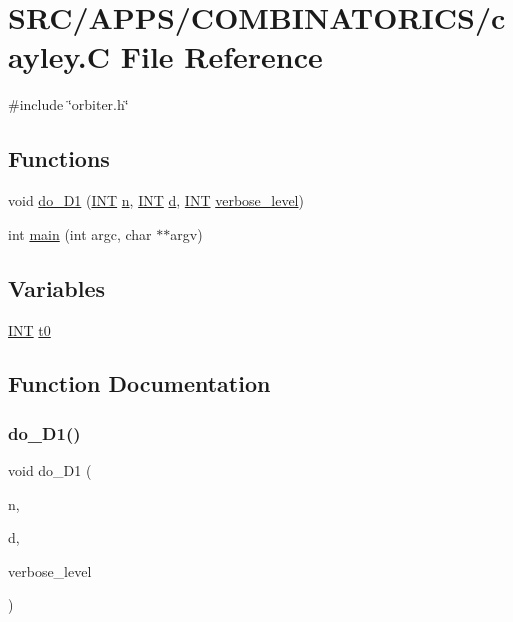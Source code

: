 \hypertarget{cayley_8_c}{}\section{S\+R\+C/\+A\+P\+P\+S/\+C\+O\+M\+B\+I\+N\+A\+T\+O\+R\+I\+C\+S/cayley.C File Reference}
\label{cayley_8_c}
{\ttfamily \#include \char`\"{}orbiter.\+h\char`\"{}}\newline
\subsection*{Functions}
\begin{DoxyCompactItemize}
\item 
void \mbox{\hyperlink{cayley_8_c_ac84dce67d54642a237f0ff351076a0d9}{do\+\_\+\+D1}} (\mbox{\hyperlink{galois_8h_a09fddde158a3a20bd2dcadb609de11dc}{I\+NT}} \mbox{\hyperlink{simeon_8_c_a7f2cd26777ce0ff3fdaf8d02aacbddfb}{n}}, \mbox{\hyperlink{galois_8h_a09fddde158a3a20bd2dcadb609de11dc}{I\+NT}} \mbox{\hyperlink{simeon_8_c_a4339ca06fa882e69473d37bd6d7917d1}{d}}, \mbox{\hyperlink{galois_8h_a09fddde158a3a20bd2dcadb609de11dc}{I\+NT}} \mbox{\hyperlink{simeon_8_c_a818073fbcc2f439e7c56952f67386122}{verbose\+\_\+level}})
\item 
int \mbox{\hyperlink{cayley_8_c_a3c04138a5bfe5d72780bb7e82a18e627}{main}} (int argc, char $\ast$$\ast$argv)
\end{DoxyCompactItemize}
\subsection*{Variables}
\begin{DoxyCompactItemize}
\item 
\mbox{\hyperlink{galois_8h_a09fddde158a3a20bd2dcadb609de11dc}{I\+NT}} \mbox{\hyperlink{cayley_8_c_a4268f4fe222ffb119218a0199f5e1904}{t0}}
\end{DoxyCompactItemize}


\subsection{Function Documentation}
\mbox{\label{cayley_8_c_ac84dce67d54642a237f0ff351076a0d9}} 
\subsubsection{\texorpdfstring{do\+\_\+\+D1()}{do\_D1()}}
{\footnotesize\ttfamily void do\+\_\+\+D1 (\begin{DoxyParamCaption}\item[{\mbox{\hyperlink{galois_8h_a09fddde158a3a20bd2dcadb609de11dc}{I\+NT}}}]{n,  }\item[{\mbox{\hyperlink{galois_8h_a09fddde158a3a20bd2dcadb609de11dc}{I\+NT}}}]{d,  }\item[{\mbox{\hyperlink{galois_8h_a09fddde158a3a20bd2dcadb609de11dc}{I\+NT}}}]{verbose\+\_\+level }\end{DoxyParamCaption})}

